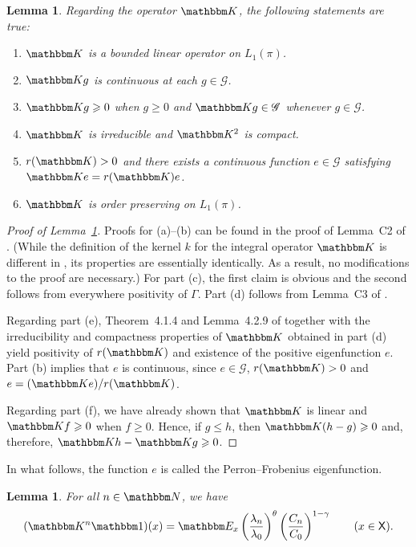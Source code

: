 \documentclass[12pt, reqno]{amsart}
\renewcommand{\leq}{\leqslant}
\renewcommand{\geq}{\geqslant}
\newcommand{\1}{\mathbbm 1}
\newcommand{\gG}{\mathscr G}
\newcommand{\NN}{\mathbbm N}
\newcommand{\KK}{\mathbbm K}
\newcommand{\EE}{\mathbbm E}
\newcommand{\XX}{\mathsf X}
\theoremstyle{plain}
\newtheorem{lemma}[theorem]{Lemma}
\theoremstyle{definition}
\begin{document}
\begin{lemma}
    \label{l:wpok}
    Regarding the operator $\KK$, the following statements are true:
    \begin{enumerate}
        \item $\KK$ is a bounded linear operator on $L_1(\pi)$.
        \item $\KK g$ is continuous at each $g \in \gG$.
        \item $\KK g \geq 0$ when $g \geq 0$ and $\KK g \in \gG$ whenever $g \in \gG$.
        \item $\KK$ is irreducible and $\KK^2$ is compact.
        \item $r(\KK) > 0$ and there exists a continuous function $e \in \gG$
            satisfying $\KK e = r(\KK) e$.  
        \item $\KK$ is order preserving on $L_1(\pi)$.
    \end{enumerate}
\end{lemma}

\begin{proof}[Proof of Lemma~\ref{l:wpok}]
    Proofs for (a)--(b) can be found in the proof of Lemma~C2 of
    \cite{borovicka2020necessary}.  (While the definition of the kernel $k$
    for the integral operator $\KK$ is
    different in \cite{borovicka2020necessary}, its properties are essentially
    identically.  As a result, no modifications to the proof are necessary.) 
    For part (c), the first claim is obvious and the second follows from
    everywhere positivity of $\Gamma$.
    Part (d) follows from Lemma~C3 of \cite{borovicka2020necessary}.

    Regarding part (e), Theorem~4.1.4 and Lemma~4.2.9 of
    \cite{meyer2012banach} together with the irreducibility and compactness
    properties of $\KK$ obtained in part (d) yield positivity of
    $r(\KK)$ and existence of the positive eigenfunction $e$.
    Part (b) implies that $e$ is continuous, since $e \in \gG$,
    $r(\KK)>0$ and $e = (\KK e) / r(\KK)$.

    Regarding part (f), we have already shown that $\KK$ is linear and $\KK f
    \geq 0$ when $f \geq 0$.  Hence, if $g \leq h$, then $\KK (h - g) \geq 0$
    and, therefore, $\KK h - \KK g \geq 0$.  
\end{proof}

In what follows, the function $e$ is called the Perron--Frobenius
eigenfunction.



\begin{lemma}\label{l:kn}
    For all $n \in \NN$, we have
    \begin{equation}\label{eq:knar}
        (\KK^n \1)(x)
        = \EE_x
         \left( \frac{\lambda_n}{\lambda_0} \right)^\theta
         \left( \frac{C_n}{C_0} \right)^{1-\gamma} 
         \qquad (x \in \XX).
    \end{equation}
\end{lemma}
\end{document}
